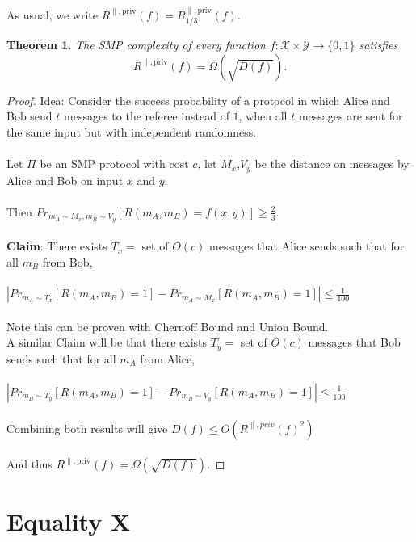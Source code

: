 \documentclass[11pt,oneside]{book}
\theoremstyle{plain}
\newtheorem{theorem}{Theorem}
\theoremstyle{definition}
\theoremstyle{plain}
\newcommand{\calX}{\mathcal{X}}
\newcommand{\calY}{\mathcal{Y}}
\begin{document}
As usual, we write $R^{\parallel,\mathrm{priv}}(f) = R^{\parallel,\mathrm{priv}}_{1/3}(f)$.

\begin{theorem}
	The SMP complexity of every function $f : \calX \times \calY \to \{0,1\}$ satisfies
	\[
	R^{\parallel,\mathrm{priv}}(f) = \Omega(\sqrt{D(f)}).
	\]
\end{theorem}

\begin{proof}
Idea: Consider the success probability of a protocol in which Alice and Bob send $t$ messages to the referee instead of $1$, when all $t$ messages are sent for the same input but with independent randomness.\\
 \\
Let $\Pi$ be an SMP protocol with cost $c$, let $M_x$,$V_y$ be the distance on messages by Alice and Bob on input $x$ and $y$.\\
 \\
Then $Pr_{m_A\sim M_x,m_B\sim V_y}[R(m_A,m_B)=f(x,y)]\ge\frac23$.\\
 \\
\textbf{Claim}: There exists $T_x=$ set of $O(c)$ messages that Alice sends such that for all $m_B$ from Bob,\\
 \\
$|Pr_{m_A\sim T_x}[R(m_A,m_B)=1]-Pr_{m_A\sim M_x}[R(m_A,m_B)=1]| \leq \frac1{100}$\\
 \\
Note this can be proven with Chernoff Bound and Union Bound.\\

A similar Claim will be that  there exists $T_y=$ set of $O(c)$ messages that Bob sends such that for all $m_A$ from Alice,\\
\\
$|Pr_{m_B\sim T_y}[R(m_A,m_B)=1]-Pr_{m_B\sim V_y}[R(m_A,m_B)=1]| \leq \frac1{100}$\\
\\
Combining both results will give $D(f)\leq O(R^{\parallel,priv}(f)^2)$\\
 \\
And thus $R^{\parallel,\mathrm{priv}}(f) = \Omega(\sqrt{D(f)})$.
\end{proof}


 
\section{Equality X}
\end{document}

